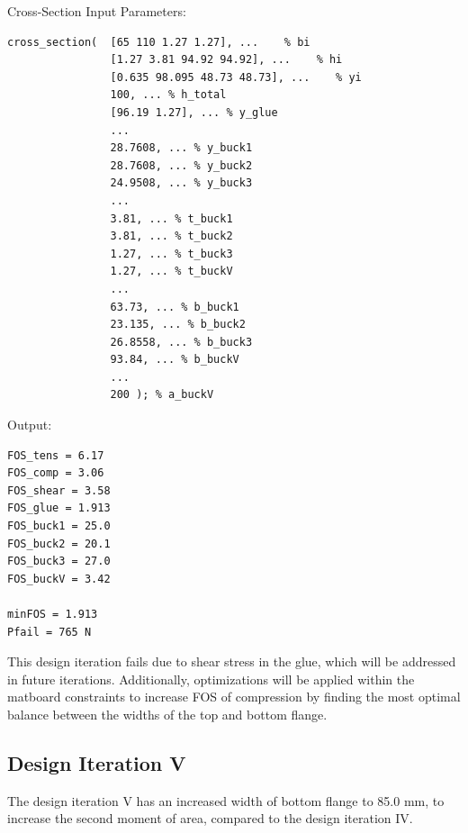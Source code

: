 \documentclass[11pt]{article}
\begin{document}
Cross-Section Input Parameters:
\begin{lstlisting}[]
cross_section(  [65 110 1.27 1.27], ...    % bi
                [1.27 3.81 94.92 94.92], ...    % hi
                [0.635 98.095 48.73 48.73], ...    % yi
                100, ... % h_total 
                [96.19 1.27], ... % y_glue
                ...
                28.7608, ... % y_buck1
                28.7608, ... % y_buck2
                24.9508, ... % y_buck3
                ...
                3.81, ... % t_buck1
                3.81, ... % t_buck2
                1.27, ... % t_buck3
                1.27, ... % t_buckV
                ...
                63.73, ... % b_buck1
                23.135, ... % b_buck2
                26.8558, ... % b_buck3
                93.84, ... % b_buckV
                ...
                200 ); % a_buckV
\end{lstlisting}

Output:
\begin{lstlisting}[]
FOS_tens = 6.17
FOS_comp = 3.06
FOS_shear = 3.58
FOS_glue = 1.913
FOS_buck1 = 25.0
FOS_buck2 = 20.1
FOS_buck3 = 27.0
FOS_buckV = 3.42

minFOS = 1.913
Pfail = 765 N
\end{lstlisting}

This design iteration fails due to shear stress in the glue, which will be addressed in future iterations. Additionally, optimizations will be applied within the matboard constraints to increase FOS of compression by finding the most optimal balance between the widths of the top and bottom flange.

\subsection{Design Iteration V}

The design iteration V has an increased width of bottom flange to 85.0 mm, to increase the second moment of area, compared to the design iteration IV.
\end{document}
